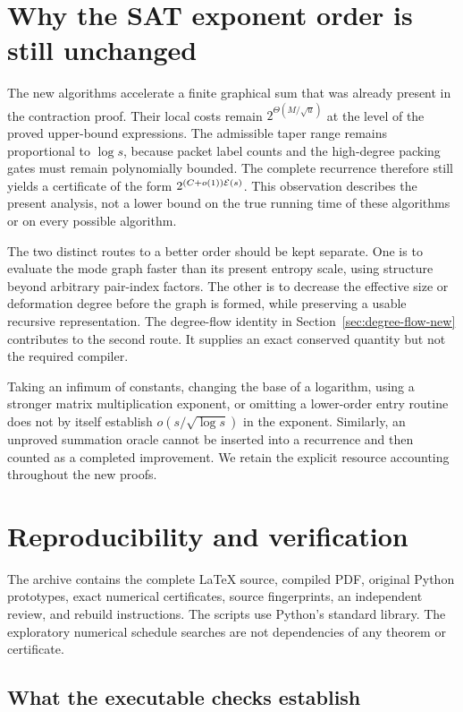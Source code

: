 \section{Why the SAT exponent order is still unchanged}
\label{sec:limits}

The new algorithms accelerate a finite graphical sum that was already
present in the contraction proof. Their local costs remain
$2^{\Theta(M/\sqrt u)}$ at the level of the proved upper-bound
expressions. The admissible taper range remains proportional to
$\log s$, because packet label counts and the high-degree packing gates
must remain polynomially bounded. The complete recurrence therefore
still yields a certificate of the form $2^{(C+o(1))\mathcal E(s)}$.
This observation describes the present analysis, not a lower bound on
the true running time of these algorithms or on every possible algorithm.

The two distinct routes to a better order should be kept separate.
One is to evaluate the mode graph faster than its present entropy scale,
using structure beyond arbitrary pair-index factors. The other is to
decrease the effective size or deformation degree before the graph is
formed, while preserving a usable recursive representation. The
degree-flow identity in Section~\ref{sec:degree-flow-new} contributes
to the second route. It supplies an exact conserved quantity but not
the required compiler.

Taking an infimum of constants, changing the base of a logarithm,
using a stronger matrix multiplication exponent, or omitting a
lower-order entry routine does not by itself establish
$o(s/\sqrt{\log s})$ in the exponent. Similarly, an unproved summation
oracle cannot be inserted into a recurrence and then counted as a
completed improvement. We retain the explicit resource accounting
throughout the new proofs.

\section{Reproducibility and verification}
\label{sec:verification}

The archive contains the complete LaTeX source, compiled PDF, original
Python prototypes, exact numerical certificates, source fingerprints,
an independent review, and rebuild instructions. The scripts use
Python's standard library. The exploratory numerical schedule searches
are not dependencies of any theorem or certificate.

\subsection{What the executable checks establish}

